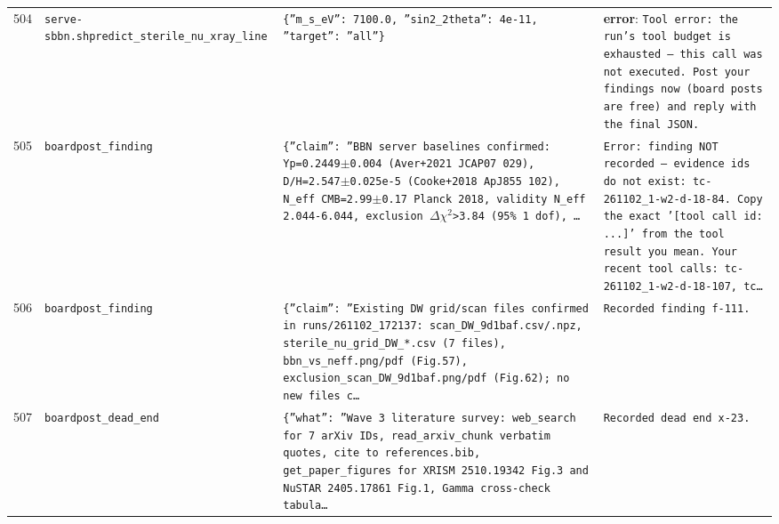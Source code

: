 \documentclass[11pt,a4paper]{article}
\begin{document}
\begin{longtable}{@{}p{}p{}p{}p{}@{}}
504 & \texttt{serve-sbbn.sh}\newline\texttt{predict\_\allowbreak{}sterile\_\allowbreak{}nu\_\allowbreak{}xray\_\allowbreak{}line} & \texttt{\{''m\_\allowbreak{}s\_\allowbreak{}eV'':\allowbreak{} 7100.0,\allowbreak{} ''sin2\_\allowbreak{}2theta'':\allowbreak{} 4e-11,\allowbreak{} ''target'':\allowbreak{} ''all''\}\allowbreak{}} & \textbf{error}: \texttt{Tool error:\allowbreak{} the run's tool budget is exhausted --- this call was not executed. Post your findings now (board posts are free)\allowbreak{} and reply with the final JSON.} \\
505 & \texttt{board}\newline\texttt{post\_\allowbreak{}finding} & \texttt{\{''claim'':\allowbreak{} ''BBN server baselines confirmed:\allowbreak{} Yp=\allowbreak{}0.2449$\pm$0.004 (Aver+2021 JCAP07 029)\allowbreak{},\allowbreak{} D/\allowbreak{}H=\allowbreak{}2.547$\pm$0.025e-5 (Cooke+2018 ApJ855 102)\allowbreak{},\allowbreak{} N\_\allowbreak{}eff CMB=\allowbreak{}2.99$\pm$0.17 Planck 2018,\allowbreak{} validity N\_\allowbreak{}eff 2.044-6.044,\allowbreak{} exclusion $\Delta$$\chi$$^2$\textgreater{}\allowbreak{}3.84 (95\% 1 dof)\allowbreak{},\allowbreak{} \ldots{}\allowbreak{}} & \texttt{Error:\allowbreak{} finding NOT recorded --- evidence ids do not exist:\allowbreak{} tc-261102\_\allowbreak{}1-w2-d-18-84. Copy the exact '[tool call id:\allowbreak{} ...]\allowbreak{}' from the tool result you mean. Your recent tool calls:\allowbreak{} tc-261102\_\allowbreak{}1-w2-d-18-107,\allowbreak{} tc\ldots{}\allowbreak{}} \\
506 & \texttt{board}\newline\texttt{post\_\allowbreak{}finding} & \texttt{\{''claim'':\allowbreak{} ''Existing DW grid/\allowbreak{}scan files confirmed in runs/\allowbreak{}261102\_\allowbreak{}172137:\allowbreak{} scan\_\allowbreak{}DW\_\allowbreak{}9d1baf.csv/\allowbreak{}.npz,\allowbreak{} sterile\_\allowbreak{}nu\_\allowbreak{}grid\_\allowbreak{}DW\_\allowbreak{}*.csv (7 files)\allowbreak{},\allowbreak{} bbn\_\allowbreak{}vs\_\allowbreak{}neff.png/\allowbreak{}pdf (Fig.57)\allowbreak{},\allowbreak{} exclusion\_\allowbreak{}scan\_\allowbreak{}DW\_\allowbreak{}9d1baf.png/\allowbreak{}pdf (Fig.62)\allowbreak{};\allowbreak{} no new files c\ldots{}\allowbreak{}} & \texttt{Recorded finding f-111.} \\
507 & \texttt{board}\newline\texttt{post\_\allowbreak{}dead\_\allowbreak{}end} & \texttt{\{''what'':\allowbreak{} ''Wave 3 literature survey:\allowbreak{} web\_\allowbreak{}search for 7 arXiv IDs,\allowbreak{} read\_\allowbreak{}arxiv\_\allowbreak{}chunk verbatim quotes,\allowbreak{} cite to references.bib,\allowbreak{} get\_\allowbreak{}paper\_\allowbreak{}figures for XRISM 2510.19342 Fig.3 and NuSTAR 2405.17861 Fig.1,\allowbreak{} Gamma cross-check tabula\ldots{}\allowbreak{}} & \texttt{Recorded dead end x-23.} \\

\end{longtable}
\end{document}
